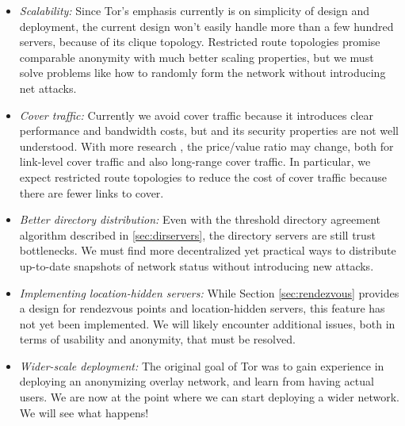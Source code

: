 \documentclass[times,10pt,twocolumn]{article}
\begin{document}
\begin{itemize}
\item \emph{Scalability:} Since Tor's emphasis currently is on simplicity
of design and deployment, the current design won't easily handle more
than a few hundred servers, because of its clique topology. Restricted
route topologies \cite{danezis-pets03} promise comparable anonymity
with much better scaling properties, but we must solve problems like
how to randomly form the network without introducing net attacks.
\item \emph{Cover traffic:} Currently we avoid cover traffic because
it introduces clear performance and bandwidth costs, but and its
security properties are not well understood. With more research
\cite{SS03,defensive-dropping}, the price/value ratio may change, both for
link-level cover traffic and also long-range cover traffic. In particular,
we expect restricted route topologies to reduce the cost of cover traffic
because there are fewer links to cover.
\item \emph{Better directory distribution:} Even with the threshold
directory agreement algorithm described in \ref{sec:dirservers},
the directory servers are still trust bottlenecks. We must find more
decentralized yet practical ways to distribute up-to-date snapshots of
network status without introducing new attacks.
\item \emph{Implementing location-hidden servers:} While Section
\ref{sec:rendezvous} provides a design for rendezvous points and
location-hidden servers, this feature has not yet been implemented.
We will likely encounter additional issues, both in terms of usability
and anonymity, that must be resolved.
\item \emph{Wider-scale deployment:} The original goal of Tor was to
gain experience in deploying an anonymizing overlay network, and learn
from having actual users. We are now at the point where we can start
deploying a wider network. We will see what happens!
\end{itemize}






\end{document}

